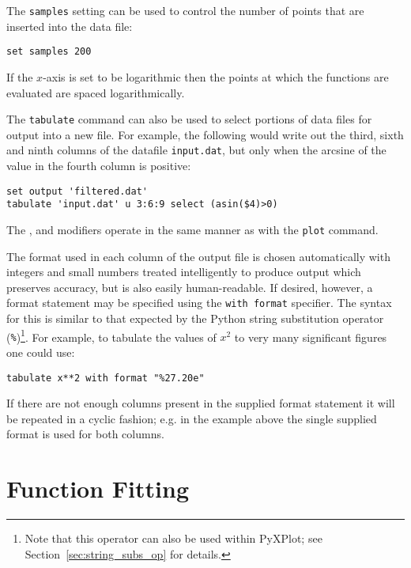 The {\tt samples} setting can be used to control the number of points that are
inserted into the data file:

\begin{verbatim}
set samples 200
\end{verbatim}

\noindent If the $x$-axis is set to be logarithmic then the points at which the
functions are evaluated are spaced logarithmically.

The {\tt tabulate} command can also be used to select portions of data files
for output into a new file.  For example, the following would write out the
third, sixth and ninth columns of the datafile {\tt input.dat}, but only when
the arcsine of the value in the fourth column is positive:

\begin{verbatim}
set output 'filtered.dat'
tabulate 'input.dat' u 3:6:9 select (asin($4)>0)
\end{verbatim}

\noindent The ,  and  modifiers
operate in the same manner as with the {\tt plot} command.

The format used in each column of the output file is chosen automatically with
integers and small numbers treated intelligently to produce output which
preserves accuracy, but is also easily human-readable. If desired, however, a
format statement may be specified using the {\tt with format} specifier. The
syntax for this is similar to that expected by the Python string substitution
operator ({\tt \%})\footnote{Note that this operator can also be used
within PyXPlot; see Section~\ref{sec:string_subs_op} for details.}.  For example,
to tabulate the values of $x^2$ to very many significant figures one could use:

\begin{verbatim}
tabulate x**2 with format "%27.20e"
\end{verbatim}

If there are not enough columns present in the supplied format statement it
will be repeated in a cyclic fashion; e.g. in the example above the single
supplied format is used for both columns.

\section{Function Fitting}
\label{sec:fit_command}

